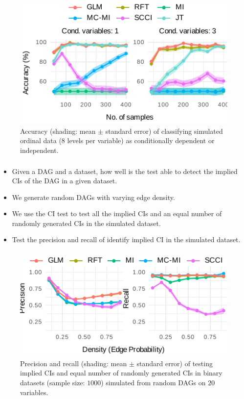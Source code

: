 \documentclass{beamer}
\begin{document}
\begin{frame}
	\frametitle{}
	\begin{figure}
		\centering
		\includegraphics{imgs/accuracy_ordinal.pdf}
		\caption*{Accuracy (shading: mean $\pm$ standard error) of
		classifying simulated ordinal data (8 levels per variable) as
		conditionally dependent or independent.}	
	\end{figure}
\end{frame}

\begin{frame}
	\frametitle{}
	\begin{itemize}
		\item Given a DAG and a dataset, how well is the test able to
			detect the implied CIs of the DAG in a given dataset.
		\item We generate random DAGs with varying edge density.
		\item We use the CI test to test all the implied CIs and an equal number of 
			randomly generated CIs in the simulated dataset.
		\item Test the precision and recall of identify implied CI in the simulated dataset.
	\end{itemize}
\end{frame}

\begin{frame}
	\frametitle{}
	\begin{figure}
		\centering
		\includegraphics{imgs/model_testing.pdf}
		\caption*{Precision and recall (shading: mean $\pm$ standard
		error) of testing implied CIs and equal number of randomly
		generated CIs in binary datasets (sample size: $1000$)
		simulated from random DAGs on $ 20 $ variables.}
	\end{figure}
\end{frame}
\end{document}
